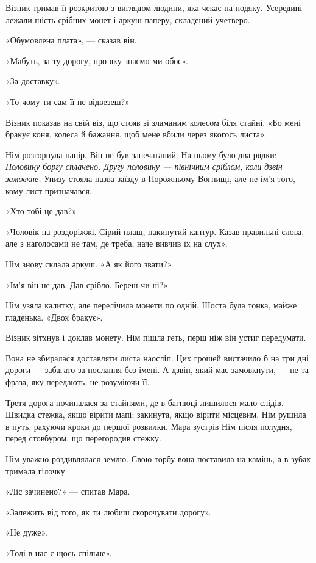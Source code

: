 \documentclass[10pt,a4paper]{article}
\begin{document}
Візник тримав її розкритою з виглядом людини, яка чекає на подяку. Усередині лежали шість срібних монет і аркуш паперу, складений учетверо.

«Обумовлена плата», --- сказав він.

«Мабуть, за ту дорогу, про яку знаємо ми обоє».

«За доставку».

«То чому ти сам її не відвезеш?»

Візник показав на свій віз, що стояв зі зламаним колесом біля стайні. «Бо мені бракує коня, колеса й бажання, щоб мене вбили через якогось листа».

Нім розгорнула папір. Він не був запечатаний. На ньому було два рядки: \emph{Половину боргу сплачено. Другу половину --- північним сріблом, коли дзвін замовкне.} Унизу стояла назва заїзду в Порожньому Вогнищі, але не ім’я того, кому лист призначався.

«Хто тобі це дав?»

«Чоловік на роздоріжжі. Сірий плащ, накинутий каптур. Казав правильні слова, але з наголосами не там, де треба, наче вивчив їх на слух».

Нім знову склала аркуш. «А як його звати?»

«Ім’я він не дав. Дав срібло. Береш чи ні?»

Нім узяла калитку, але перелічила монети по одній. Шоста була тонка, майже гладенька. «Двох бракує».

Візник зітхнув і доклав монету. Нім пішла геть, перш ніж він устиг передумати.

Вона не збиралася доставляти листа наосліп. Цих грошей вистачило б на три дні дороги --- забагато за послання без імені. А дзвін, який має замовкнути, --- не та фраза, яку передають, не розуміючи її.

Третя дорога починалася за стайнями, де в багнюці лишилося мало слідів. Швидка стежка, якщо вірити мапі; закинута, якщо вірити місцевим. Нім рушила в путь, рахуючи кроки до першої розвилки.
Мара зустрів Нім після полудня, перед стовбуром, що перегородив стежку.

Нім уважно роздивлялася землю. Свою торбу вона поставила на камінь, а в зубах тримала гілочку.

«Ліс зачинено?» --- спитав Мара.

«Залежить від того, як ти любиш скорочувати дорогу».

«Не дуже».

«Тоді в нас є щось спільне».
\end{document}
